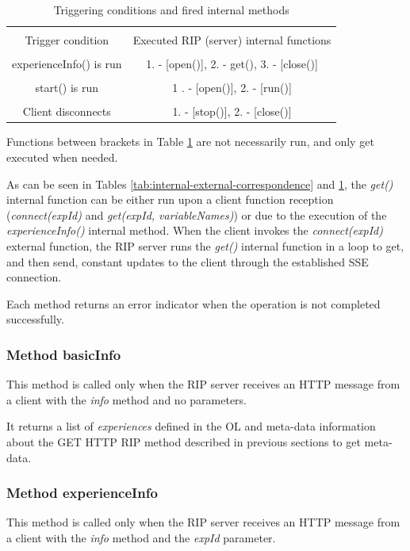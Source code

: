 \begin{table}[b!]
    \centering
    \begin{tabular}{|c|c|}
        \hline
        & \\Trigger condition & Executed RIP (server) internal functions \\
        \hline
        & \\experienceInfo() is run & 1. - [open()], 2. - get(), 3. - [close()] \\
        \hline
        & \\start() is run & 1 . - [open()], 2. - [run()] \\
        \hline
        & \\Client disconnects & 1. - [stop()], 2. - [close()] \\
        \hline
    \end{tabular}
    \caption{Triggering conditions and fired internal methods}
    \label{tab:trigerring-internal-correspondence}
\end{table}

Functions between brackets in Table \ref{tab:trigerring-internal-correspondence} are not necessarily run, and only get executed when needed.

As can be seen in Tables \ref{tab:internal-external-correspondence} and \ref{tab:trigerring-internal-correspondence}, the \textit{get()} internal function can be either run upon a client function reception (\textit{connect(expId)} and \textit{get(expId, variableNames)}) or due to the execution of the \textit{experienceInfo()} internal method. When the client invokes the \textit{connect(expId)} external function, the RIP server runs the \textit{get()} internal function in a loop to get, and then send, constant updates to the client through the established SSE connection.

Each method returns an error indicator when the operation is not completed successfully.

\subsubsection{Method basicInfo}
This method is called only when the RIP server receives an HTTP message from a client with the \textit{info} method and no parameters.

It returns a list of \textit{experiences} defined in the OL and meta-data information about the GET HTTP RIP method described in previous sections to get meta-data.

\subsubsection{Method experienceInfo}
This method is called only when the RIP server receives an HTTP message from a client with the \textit{info} method and the \textit{expId} parameter.

